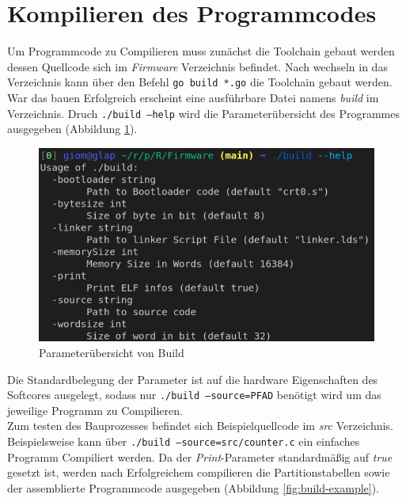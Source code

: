     \section{Kompilieren des Programmcodes}
        Um Programmcode zu Compilieren muss zunächst die Toolchain gebaut werden
        dessen Quellcode sich im \textit{Firmware} Verzeichnis befindet.
        Nach wechseln in das Verzeichnis kann über den Befehl \texttt{go build *.go}
        die Toolchain gebaut werden. War das bauen Erfolgreich erscheint
        eine ausführbare Datei namens \textit{build} im Verzeichnis.
        Druch \texttt{./build --help} wird die Parameterübersicht des Programmes
        ausgegeben (Abbildung \ref{fig:build-help}).

        \begin{figure}[H]
            \centering
            \includegraphics[scale=1]{img/build_help.png}
            \caption{Parameterübersicht von Build}
            \label{fig:build-help}
        \end{figure}
        Die Standardbelegung der Parameter ist auf die hardware Eigenschaften des
        Softcores ausgelegt, sodass nur \texttt{./build --source=PFAD} benötigt wird
        um das jeweilige Programm zu Compilieren.
        \\
        Zum testen des Bauprozesses befindet sich Beispielquellcode im
        \textit{src} Verzeichnis.
        Beispielsweise kann über \texttt{./build --source=src/counter.c}
        ein einfaches Programm Compiliert werden. Da der \textit{Print}-Parameter
        standardmäßig auf \textit{true} gesetzt ist, werden nach Erfolgreichem
        compilieren die Partitionstabellen sowie der assemblierte Programmcode
        ausgegeben (Abbildung \ref{fig:build-example}).



